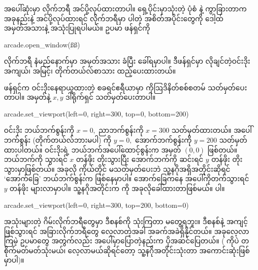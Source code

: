 \begin{figure}[tb!]
\caption{}
\label{fig:ch07starter}
\end{figure}

အပေါ်ဆုံးမှာ  လိုက်ဘရီ အင်ပို့လုပ်ထားတာပါ။ ရှေ့ပိုင်းမှာသုံးတဲ့    ပုံစံ နဲ့ ကွာခြားတာက အခုနည်းနဲ့ အင်ပို့လုပ်ထားရင် လိုက်ဘရီမှာ ပါတဲ့ အစိတ်အပိုင်းတွေကို ဒေါ့ထ်အမှတ်အသားနဲ့ အသုံးပြုရပါမယ်။ ဥပမာ  ဖန်ရှင်ကို
\begin{codetxt}
arcade.open_window(ßß)
\end{codetxt} 
လိုက်ဘရီ နံမည်နောက်မှာ \fEn{(}\fEn{)} အမှတ်အသား ခံပြီး ခေါ်ရမှာပါ။ ဒီဖန်ရှင်မှာ လိုချင်တဲ့ဝင်းဒိုး အကျယ်၊ အမြင့်၊ တိုက်တယ်လ်စာသား ထည့်ပေးထားတယ်။ 

 ဖန်ရှင်က ဝင်းဒိုးနေရာယူထားတဲ့ စခရင်ဧရီယာမှာ ကိုဩဒိနိတ်စစ်စတမ် သတ်မှတ်ပေးတာပါ။  အမှတ်နဲ့  $x, y$ ဒါရိုက်ရှင် သတ်မှတ်ပေးတာပါ။
%
\begin{py}
arcade.set_viewport(left=0, right=300, top=0, bottom=200)
\end{py}
%
ဝင်းဒိုး ဘယ်ဘက်စွန်းကို $x = 0,$ ညာဘက်စွန်းကို $x = 300$ သတ်မှတ်ထားတယ်။ အပေါ်ဘက်စွန်း (တိုက်တယ်လ်ဘားမပါ) ကို $y = 0,$ အောက်ဘက်စွန်းကို $y = 200$ သတ်မှတ်ထားပါတယ်။ ဝင်းဒိုးရဲ့ ဘယ်ဘက်အပေါ်ထောင့်စွန်းက  အမှတ် $(0,0)$ ဖြစ်တယ်။ ဘယ်ဘက်ကို သွားရင် $x$ တန်ဖိုး တိုးသွားပြီး အောက်ဘက်ကို ဆင်းရင် $y$ တန်ဖိုး တိုးသွားမှာဖြစ်တယ်။ အခုလို ကိုယ်တိုင်  မသတ်မှတ်ပေးဘဲ  သူ့နဂိုအရှိအတိုင်းဆိုရင် ‘အောက်ခြေ’ ဘယ်ဘက်စွန်းက  ဖြစ်နေမှာပါ။ အောက်ခြေကနေ အပေါ်ကိုတက်သွားရင် $y$ တန်ဖိုး များလာမှာပါ။ သူ့နဂိုအတိုင်းက  ကို အခုလိုခေါ်ထားတာဖြစ်မယ်။ \fEn{,}  ပါ။
%
\begin{py}
arcade.set_viewport(left=0, right=300, top=200, bottom=0)
\end{py}
%
အသုံးများတဲ့ ဂိမ်းလိုက်ဘရီတွေမှာ ဒီစနစ်ကို သုံးကြတာ မတွေ့ရဘူး။ ဒီစနစ်နဲ့ အကျင့်ဖြစ်သွားရင် အခြားလိုက်ဘရီတွေ လေ့လာတဲ့အခါ အခက်အခဲရှိနိုင်တယ်။ အခုလေ့လာကြမဲ့ ဥပမာတွေ အတွက်လည်း အပေါ်မှာပြောတဲ့နည်းက ပိုအဆင်ပြေတယ်။ ( ကိုပဲ တစိုက်မတ်မတ်သုံးမယ်၊ လေ့လာမယ်ဆိုရင်တော့ သူ့နဂိုအတိုင်းသုံးတာ အကောင်းဆုံးဖြစ်မှာပါ)။

